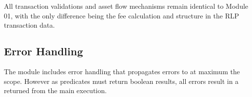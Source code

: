 All transaction validations and asset flow mechanisms remain identical to Module 01, with the only difference being the
fee calculation and structure in the RLP transaction data.


\subsection{Error Handling}
The module includes error handling that propagates errors to at maximum the  scope. However as predicates
must return boolean results, all errors result in a  returned from the main execution.




